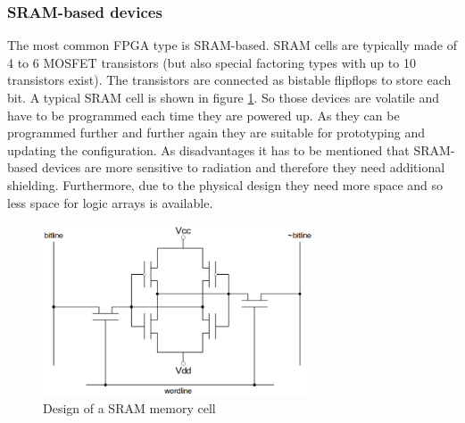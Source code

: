 \subsubsection{SRAM-based devices}
The most common FPGA type is SRAM-based. SRAM cells are typically made of 4 to 6 MOSFET transistors (but also special factoring types with up to 10 transistors exist). The transistors are connected as bistable flipflops to store each bit. A typical SRAM cell is shown in figure \ref{fig:SRAMaufbau}. So those devices are volatile and have to be programmed each time they are powered up. As they can be programmed further and further again they are suitable for prototyping and updating the configuration. As disadvantages it has to be mentioned that SRAM-based devices are more sensitive to radiation and therefore they need additional shielding. Furthermore, due to the physical design they need more space and so less space for logic arrays is available.\cite{Maxfield2009}\\
\begin{figure}[htbp]
\begin{center}
\includegraphics[width=8cm,keepaspectratio=true]{bilder/png/SRAMaufbau}
\caption{Design of a SRAM memory cell\cite{Core16}}
\label{fig:SRAMaufbau}
\end{center}
\end{figure}
